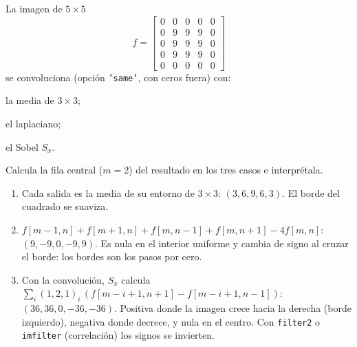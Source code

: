 \documentclass[11pt,a4paper]{scrartcl}
\begin{document}
\begin{ejercicio}
  La imagen de $5\times5$
  \[
    f=\begin{bmatrix}0&0&0&0&0\\0&9&9&9&0\\0&9&9&9&0\\0&9&9&9&0\\0&0&0&0&0\end{bmatrix}
  \]
  se convoluciona (opción \texttt{'same'}, con ceros fuera) con:
  \begin{incisos}[3]
    \item la media de $3\times3$;
    \item el laplaciano;
    \item el Sobel $S_x$.
  \end{incisos}
  Calcula la fila central ($m=2$) del resultado en los tres casos e interprétala.
\end{ejercicio}
\begin{solucion}
  \begin{enumerate}[label=\alph*)]
    \item Cada salida es la media de su entorno de $3\times3$: $(3,6,9,6,3)$. El borde del cuadrado se suaviza.
    \item $f[m-1,n]+f[m+1,n]+f[m,n-1]+f[m,n+1]-4f[m,n]$: $(9,-9,0,-9,9)$. Es nula en el interior uniforme y cambia de signo al cruzar el borde: los bordes son los pasos por cero.
    \item Con la convolución, $S_x$ calcula $\sum_i(1,2,1)_i\,(f[m-i+1,n+1]-f[m-i+1,n-1])$: $(36,36,0,-36,-36)$. Positiva donde la imagen crece hacia la derecha (borde izquierdo), negativa donde decrece, y nula en el centro. Con \texttt{filter2} o \texttt{imfilter} (correlación) los signos se invierten.
  \end{enumerate}
\end{solucion}
\end{document}
